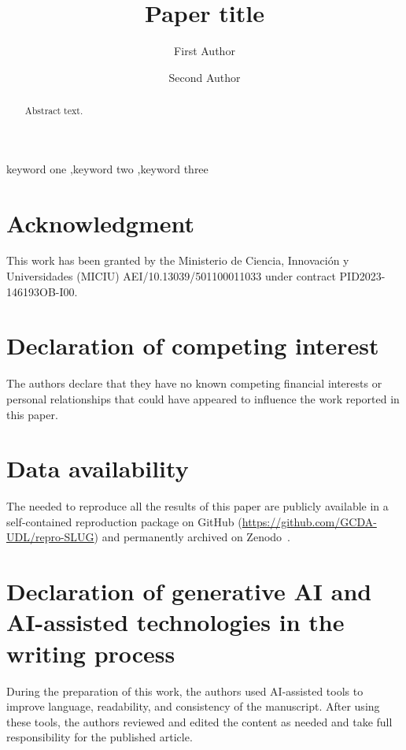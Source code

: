\documentclass[preprint,12pt]{elsarticle}
\begin{document}
\begin{frontmatter}

\title{Paper title}

\author[sembac]{First Author}
\author[sembac]{Second Author}


\begin{abstract}
Abstract text.
\end{abstract}

\begin{keyword}
keyword one \sep keyword two \sep keyword three
\end{keyword}

\end{frontmatter}







\section*{Acknowledgment}
This work has been granted by the Ministerio de Ciencia, Innovación y Universidades (MICIU) AEI/10.13039/501100011033 under contract PID2023-146193OB-I00.

\section*{Declaration of competing interest}
The authors declare that they have no known competing financial interests or personal relationships that could have appeared to influence the work reported in this paper.

\section*{Data availability}
The  needed to reproduce all the results of this paper are publicly available in a self-contained  reproduction package on GitHub (\url{https://github.com/GCDA-UDL/repro-SLUG}) and permanently archived on Zenodo~.

\section*{Declaration of generative AI and AI-assisted technologies in the writing process}
During the preparation of this work, the authors used AI-assisted tools to improve language, readability, and consistency of the manuscript. After using these tools, the authors reviewed and edited the content as needed and take full responsibility for the published article.



\end{document}
